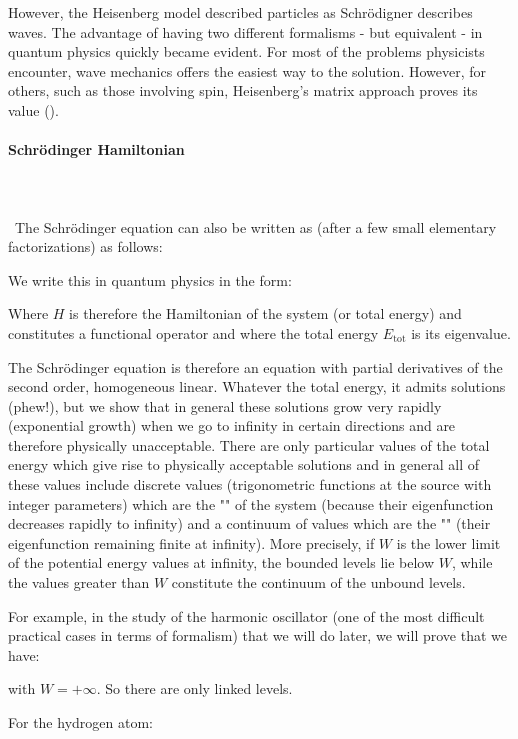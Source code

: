 	However, the Heisenberg model described particles as Schrödigner describes waves. The advantage of having two different formalisms - but equivalent - in quantum physics quickly became evident. For most of the problems physicists encounter, wave mechanics offers the easiest way to the solution. However, for others, such as those involving spin, Heisenberg's matrix approach proves its value ().
	
	\paragraph{Schrödinger Hamiltonian}\mbox{}\\\\\
	The Schrödinger equation can also be written as (after a few small elementary factorizations) as follows:
	
	We write this in quantum physics in the form:
	
	Where $H$ is therefore the Hamiltonian of the system (or total energy) and constitutes a functional operator and where the total energy $E_\text{tot}$ is its eigenvalue.
	
	The Schrödinger equation is therefore an equation with partial derivatives of the second order, homogeneous linear. Whatever the total energy, it admits solutions (phew!), but we show that in general these solutions grow very rapidly (exponential growth) when we go to infinity in certain directions and are therefore physically unacceptable. There are only particular values of the total energy which give rise to physically acceptable solutions and in general all of these values include discrete values (trigonometric functions at the source with integer parameters) which are the "" of the system (because their eigenfunction decreases rapidly to infinity) and a continuum of values which are the "" (their eigenfunction remaining finite at infinity). More precisely, if $W$ is the lower limit of the potential energy values at infinity, the bounded levels lie below $W$, while the values greater than $W$ constitute the continuum of the unbound levels.

	For example, in the study of the harmonic oscillator (one of the most difficult practical cases in terms of formalism) that we will do later, we will prove that we have:
	
	with $W=+\infty$. So there are only linked levels.

	For the hydrogen atom:
	
